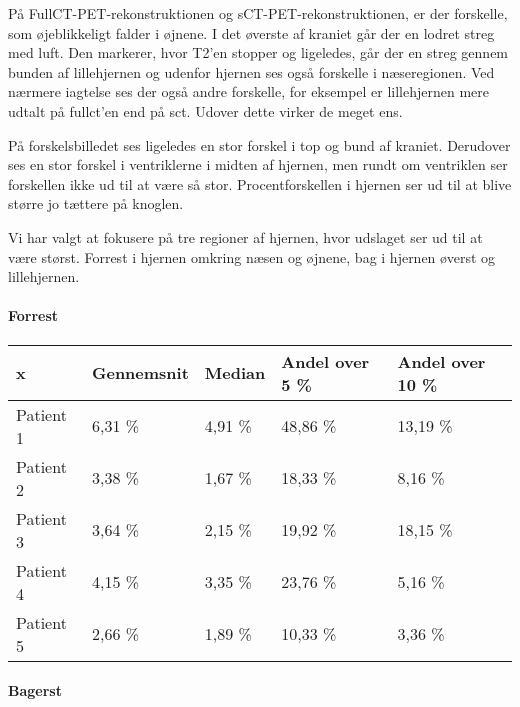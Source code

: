 


På FullCT-PET-rekonstruktionen og sCT-PET-rekonstruktionen, er der
forskelle, som øjeblikkeligt falder i øjnene. I det øverste af kraniet
går der en lodret streg med luft. Den markerer, hvor T2'en stopper
og ligeledes, går der en streg gennem bunden af lillehjernen og udenfor
hjernen ses også forskelle i næseregionen. Ved nærmere iagtelse ses
der også andre forskelle, for eksempel er lillehjernen mere udtalt på
fullct'en end på sct. Udover dette virker de meget ens.


På forskelsbilledet ses ligeledes en stor forskel i top og bund af
kraniet. Derudover ses en stor forskel i ventriklerne i midten af
hjernen, men rundt om ventriklen ser forskellen ikke ud til at være så
stor. Procentforskellen i hjernen ser ud til at blive større jo tættere
på knoglen.

Vi har valgt at fokusere på tre regioner af hjernen, hvor udslaget ser ud
til at være størst. Forrest i hjernen omkring næsen og øjnene, bag
i hjernen øverst og lillehjernen.


\paragraph{Forrest}

\begin{center}
    \begin{tabular}{| l | l | l | l | l |}
    \hline
    x & Gennemsnit & Median & Andel over 5 \% & Andel over 10 \% \\ \hline
    Patient 1 & 6,31 \% & 4,91 \% & 48,86 \% & 13,19 \% \\ \hline
    Patient 2 & 3,38 \% & 1,67 \% & 18,33 \% & 8,16 \% \\ \hline
    Patient 3 & 3,64 \% & 2,15 \% & 19,92 \% & 18,15 \% \\ \hline
    Patient 4 & 4,15 \% & 3,35 \% & 23,76 \% & 5,16 \% \\ \hline
    Patient 5 & 2,66 \% & 1,89 \% & 10,33 \% & 3,36 \% \\ \hline
    \end{tabular}
\end{center}

\paragraph{Bagerst}


